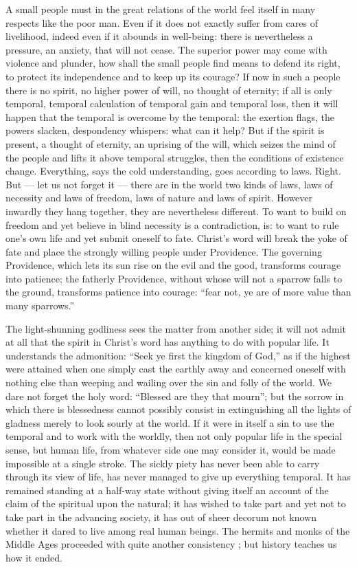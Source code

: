 \documentclass[12pt,a4paper,openany]{book}
\newcommand{\opage}[1]{\marginnote{\footnotesize\textit{[#1]}}}
\begin{document}
A small people must in the great relations of the world feel itself in many respects like the poor man. Even if it does not exactly suffer from cares of livelihood, indeed even if it abounds in well-being: there is nevertheless a pressure, an anxiety, that will not cease. The superior power may come with violence and plunder, how shall the small people find means to defend its right, to protect its independence and to keep up its courage? If now in such a people there is no spirit, no higher power of will, no thought of eternity; if all is only temporal, temporal calculation of temporal gain and temporal loss, then it will happen that the temporal is overcome by the temporal: the exertion flags, the powers slacken, despondency whispers: what can it help? %
But if the spirit is present, a thought of eternity, an uprising of the will, which seizes the mind of the people and lifts it above temporal struggles, then the conditions of existence change. Everything, says the cold understanding, goes according to laws. Right. But --- let us not forget it --- there are in the world two kinds of laws, laws of necessity and laws of freedom, laws of nature and laws of spirit. However inwardly they hang together, they are nevertheless different. To want to build on freedom and yet believe in blind necessity is a contradiction, is: to want to rule one's own life and yet submit oneself to fate. Christ's word will break the yoke of fate and place the strongly willing people under Providence. The governing Providence, which lets its sun rise on the evil and the good, transforms courage into patience; the fatherly Providence, without whose will not a sparrow falls to the ground,
\setcounter{footnote}{0}%
\opage{30}transforms patience into courage: ``fear not, ye are of more value than many sparrows.''

The light-shunning godliness sees the matter from another side; it will not admit at all that the spirit in Christ's word has anything to do with popular life. It understands the admonition: ``Seek ye first the kingdom of God,'' as if the highest were attained when one simply cast the earthly away and concerned oneself with nothing else than weeping and wailing over the sin and folly of the world. We dare not forget the holy word: ``Blessed are they that mourn''; but the sorrow in which there is blessedness cannot possibly consist in extinguishing all the lights of gladness merely to look sourly at the world. If it were in itself a sin to use the temporal and to work with the worldly, then not only popular life in the special sense, but human life, from whatever side one may consider it, would be made impossible at a single stroke. The sickly piety has never been able to carry through its view of life, has never managed to give up everything temporal. It has remained standing at a half-way state without giving itself an account of the claim of the spiritual upon the natural; it has wished to take part and yet not to take part in the advancing society, it has out of sheer decorum not known whether it dared to live among real human beings. The hermits and monks of the Middle Ages proceeded with quite another consistency ; but history teaches us how it ended.
\end{document}
